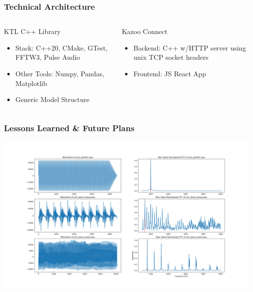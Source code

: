 \documentclass[
	11pt, %
]{beamer}
\begin{document}

\begin{frame}
  \frametitle{Technical Architecture}



  \begin{columns}[c] %
    \begin{column}{0.5\textwidth} %
      KTL C++ Library
      \begin{itemize}
        \item Stack: C++20, CMake, GTest, FFTW3, Pulse Audio
        \item Other Tools: Numpy, Pandas, Matplotlib
        \item Generic Model Structure
      \end{itemize}

    \end{column}
    \begin{column}{0.5\textwidth} %
      Kazoo Connect

      \begin{itemize}
        \item Backend: C++ w/HTTP server using unix TCP socket headers
        \item Frontend: JS React App
      \end{itemize}

    \end{column}
  \end{columns}

\end{frame}


\begin{frame}
  \frametitle{Lessons Learned \& Future Plans}

  \begin{center}
    \includegraphics[width=1\linewidth]{kazoo_struggles.png}
  \end{center}

  \bigskip %

\end{frame}
\end{document}
